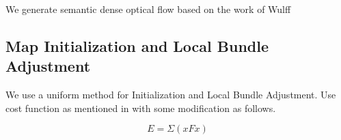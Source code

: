 \documentclass{article}
\begin{document}
We generate semantic dense optical flow based on the work of Wulff \cite{Wulff2017Optical}

\subsection{Map Initialization and Local Bundle Adjustment}

We use a uniform method for Initialization and Local Bundle Adjustment. Use cost function as mentioned in \cite{Delaunoy2014Photometric} with some modification as follows.

\begin{equation}
E = \Sigma(xFx)

\end{equation}




\end{document}
